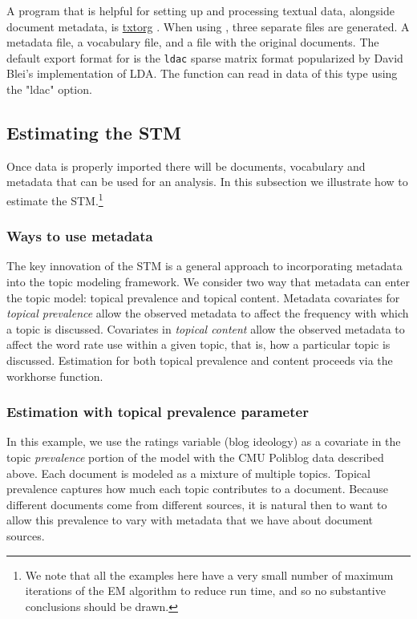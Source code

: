 \documentclass[nojss]{jss}
\begin{document}
A program that is helpful for setting up and processing textual data, alongside document metadata, is \href{www.txtorg.org}{txtorg} \citep{TextComparative}. When using , three separate files are generated. A metadata file, a vocabulary file, and a file with the original documents. The default export format for  is the \texttt{ldac} sparse matrix format popularized by David Blei's implementation of LDA.  The  function can read in data of this type using the "ldac" option.

\subsection{Estimating the STM}

Once data is properly imported there will be documents, vocabulary and metadata that can be used for an analysis. In this subsection we illustrate how to estimate the STM.\footnote{We note that all the examples here have a very small number of maximum iterations of the EM algorithm to reduce run time, and so no substantive conclusions should be drawn.}

\subsubsection{Ways to use metadata}

The key innovation of the STM is a general approach to incorporating metadata into the topic modeling framework.  We consider two way that metadata can enter the topic model: topical prevalence and topical content.  Metadata covariates for \emph{topical prevalence} allow the observed metadata to affect the frequency with which a topic is discussed.  Covariates in \emph{topical content} allow the observed metadata to affect the word rate use within a given topic, that is, how a particular topic is discussed. Estimation for both topical prevalence and content proceeds via the workhorse  function. 

\subsubsection{Estimation with topical prevalence parameter}

In this example, we use the ratings variable (blog ideology) as a covariate in the topic \emph{prevalence} portion of the model with the CMU Poliblog data described above. Each document is modeled as a mixture of multiple topics. Topical prevalence captures how much each topic contributes to a document. Because different documents come from different sources, it is natural then to want to allow this prevalence to vary with metadata that we have about document sources.
\end{document}
